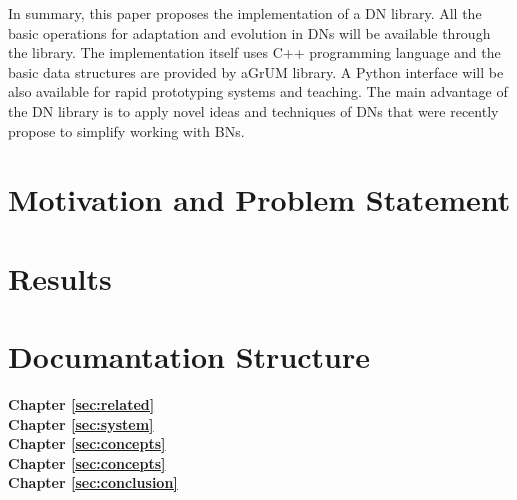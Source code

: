 In summary, this paper proposes the implementation of a DN library.
All the basic operations for adaptation and evolution in DNs will be available through the library.
The implementation itself uses C++ programming language and the basic data structures are provided by aGrUM library.
A Python interface will be also available for rapid prototyping systems and teaching.
The main advantage of the DN library is to apply novel ideas and techniques of DNs that were recently propose to simplify working with BNs.



\section{Motivation and Problem Statement}
\label{sec:intro:motivation}



\section{Results}
\label{sec:intro:results}



\section{Documantation Structure}
\label{sec:intro:structure}

\textbf{Chapter \ref{sec:related}} \\[0.2em]


\textbf{Chapter \ref{sec:system}} \\[0.2em]


\textbf{Chapter \ref{sec:concepts}} \\[0.2em]


\textbf{Chapter \ref{sec:concepts}} \\[0.2em]


\textbf{Chapter \ref{sec:conclusion}} \\[0.2em]

